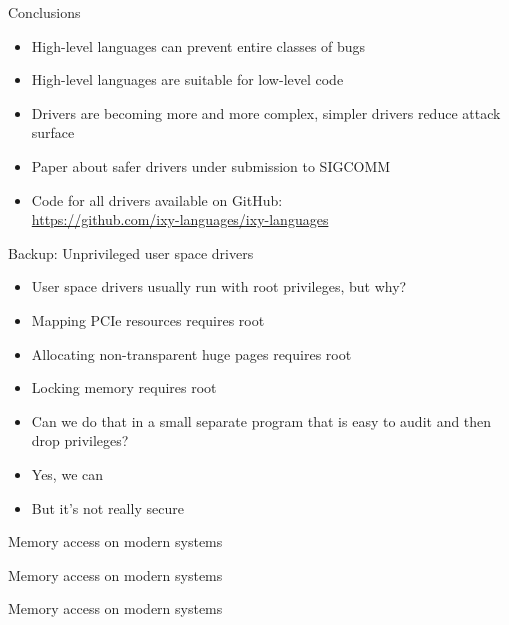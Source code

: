 \documentclass[NET,english,aspectratio=169,notitleframe]{tumbeamer}
\begin{document}
\begin{frame}{Conclusions}
\begin{itemize}
\item High-level languages can prevent entire classes of bugs
\item High-level languages are suitable for low-level code
\item Drivers are becoming more and more complex, simpler drivers reduce attack surface
\vspace{0em}
\item Paper about safer drivers under submission to SIGCOMM
\item Code for all drivers available on GitHub: \\\url{https://github.com/ixy-languages/ixy-languages}

\end{itemize}
\end{frame}

\begin{frame}{Backup: Unprivileged user space drivers}
\begin{itemize}
\item User space drivers usually run with root privileges, but why?
\pause
\vspace{1em}
\item Mapping PCIe resources requires root
\item Allocating non-transparent huge pages requires root
\item Locking memory requires root
\vspace{1em}
\item Can we do that in a small separate program that is easy to audit and then drop privileges?
\pause
\item Yes, we can
\item But it's not really secure
\end{itemize}
\end{frame}

\begin{frame}{Memory access on modern systems}
\centering
\end{frame}

\begin{frame}{Memory access on modern systems}
\centering
\end{frame}

\begin{frame}{Memory access on modern systems}
\centering
\end{frame}
\end{document}
